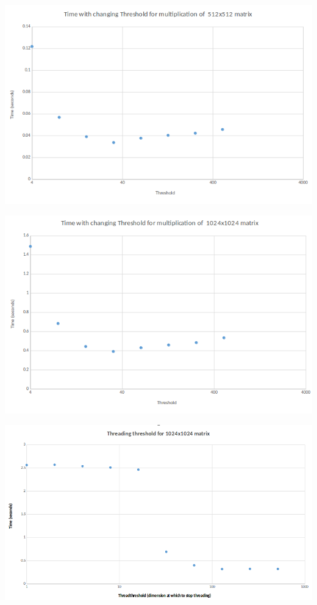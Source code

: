 \documentclass[11pt]{article}
\begin{document}
\begin{center}
\includegraphics[scale=0.7]{threshold512}
\end{center}


\begin{center}
\includegraphics[scale=0.7]{threshold1024}
\end{center}


\begin{center}
\includegraphics[scale=0.5]{threadthreshold}
\end{center}
\end{document}
